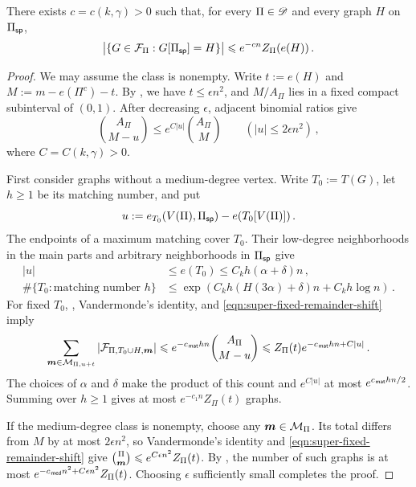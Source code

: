 \begin{lemma}\label{lemma:super-fixed-remainder}
There exists $c=c(k,\gamma)>0$ such that, for every $\Pi\in{\mathscr D}$ and every graph $H$ on $\Pi_{\mathsf{sp}}$,
\begin{equation}\label{eqn:super-fixed-remainder}
\big|\{G\in{\mathcal F}_\Pi:G[\Pi_{\mathsf{sp}}]=H\}\big|\leqslant e^{-cn}Z_\Pi(e(H))\,.
\end{equation}
\end{lemma}
\begin{proof}
We may assume the class is nonempty. Write $t:=e(H)$ and $M:=m-e(\Pi^c)-t$. By , we have $t\leq\epsilon n^2$, and $M/A_\Pi$ lies in a fixed compact subinterval of $(0,1)$. After decreasing $\epsilon$, adjacent binomial ratios give
\begin{equation}\label{eqn:super-fixed-remainder-shift}
\binom{A_\Pi}{M-u}\leq e^{C|u|}\binom{A_\Pi}{M}\qquad(|u|\leq2\epsilon n^2)\,,
\end{equation}
where $C=C(k,\gamma)>0$.

First consider graphs without a medium-degree vertex. Write $T_0:=T(G)$, let $h\geq1$ be its matching number, and put
$$u:=e_{T_0}(V(\Pi),\Pi_{\mathsf{sp}})-e(T_0[V(\Pi)])\,.$$
The endpoints of a maximum matching cover $T_0$. Their low-degree neighborhoods in the main parts and arbitrary neighborhoods in $\Pi_{\mathsf{sp}}$ give
\begin{align*}
|u|&\leq e(T_0)\leq C_kh(\alpha+\delta)n\,,\\
\#\{T_0:\text{matching number }h\}&\leq\exp\!\left(C_kh(H(3\alpha)+\delta)n+C_kh\log n\right)\,.
\end{align*}
For fixed $T_0$, , Vandermonde's identity, and \eqref{eqn:super-fixed-remainder-shift} imply
$$\sum_{\boldsymbol{m}\in{\mathcal M}_{\Pi,u+t}}|{\mathcal F}_{\Pi,T_0\cup H,\boldsymbol{m}}|\leqslant e^{-c_{\hspace{0.2mm}\mathsf{mat}} hn}\binom{A_\Pi}{M-u}\leqslant Z_\Pi(t)e^{-c_{\hspace{0.2mm}\mathsf{mat}} hn+C|u|}\,.$$
The choices of $\alpha$ and $\delta$ make the product of this count and $e^{C|u|}$ at most $e^{c_{\hspace{0.2mm}\mathsf{mat}} hn/2}$. Summing over $h\geq1$ gives at most $e^{-c_1n}Z_\Pi(t)$ graphs.

If the medium-degree class is nonempty, choose any $\boldsymbol{m}\in{\mathcal M}_\Pi$. Its total differs from $M$ by at most $2\epsilon n^2$, so Vandermonde's identity and \eqref{eqn:super-fixed-remainder-shift} give $\binom{\Pi}{\boldsymbol{m}}\leqslant e^{C\epsilon n^2}Z_\Pi(t)$. By , the number of such graphs is at most $e^{-c_{\hspace{0.2mm}\mathsf{med}} n^2+C\epsilon n^2}Z_\Pi(t)$. Choosing $\epsilon$ sufficiently small completes the proof.
\end{proof}


